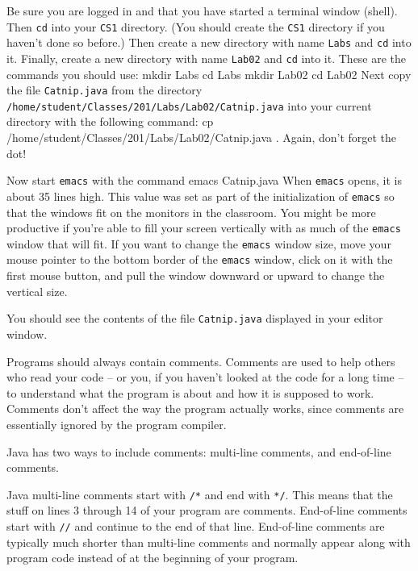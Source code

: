 \documentclass[12pt]{article}
\newcommand{\fname}[1]{\texttt{#1}}
\newcommand{\code}[1]{\texttt{#1}}
\newenvironment{qv}%
  {\quote
   \verbatim}%
  {\endverbatim
   \endquote}
\begin{document}
Be sure you are logged in
and that you have started a terminal window (shell).
Then \fname{cd} into your \fname{CS1} directory.
(You should create the \fname{CS1} directory
if you haven't done so before.)
Then create a new directory with name \fname{Labs} and \code{cd} into it.
Finally, create a new directory with name \fname{Lab02} and \code{cd} into it.
These are the commands you should use:
\begin{qv}
mkdir Labs
cd Labs
mkdir Lab02
cd Lab02
\end{qv}
Next copy the file \fname{Catnip.java}
from the directory \fname{/home/student/Classes/201/Labs/Lab02/Catnip.java}
into your current directory with the following command:
\begin{qv}
cp /home/student/Classes/201/Labs/Lab02/Catnip.java .
\end{qv}
Again, don't forget the dot!

Now start \fname{emacs} with the command
\begin{qv}
emacs Catnip.java
\end{qv}
When \fname{emacs} opens, it is about 35 lines high. This value was
set as part of the initialization of \fname{emacs} so that the windows
fit on the monitors in the classroom. You might be more productive
if you're able to fill your screen vertically
with as much of the \fname{emacs} window that will fit.
If you want to change the \fname{emacs} window size,
move your mouse pointer
to the bottom border of the \fname{emacs} window, click on it with the
first mouse button, and pull the window downward or upward to change the
vertical size.

You should see the contents of the file \fname{Catnip.java} displayed
in your editor window.

Programs should always contain comments.
Comments are used to help others who read your code --
or you, if you haven't looked at the code for a long time --
to understand what the program is about and how it is supposed to work.
Comments don't affect the way the program actually works,
since comments are essentially ignored by the program compiler.

Java has two ways to include comments:
multi-line comments, and end-of-line comments.

Java multi-line comments start with \verb./*. and end with \verb.*/..
This means that the stuff on lines 3 through 14 of your program are comments.
End-of-line comments start with \verb.//.
and continue to the end of that line.
End-of-line comments are typically much shorter
than multi-line comments and normally appear along with program code
instead of at the beginning of your program.
\end{document}
